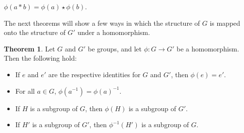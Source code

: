 \documentclass[12pt]{article}
\newcommand{\inv}[1]{#1^{-1}}
\theoremstyle{definition}
\newtheorem{theorem}{Theorem}[section]
\theoremstyle{definition}
\theoremstyle{definition}
\theoremstyle{definition}
\begin{document}
\begin{center}
    $\phi(a*b) = \phi(a) \star \phi(b)$.
\end{center}

The next theorems will show a few ways in which the structure of $G$ is mapped onto the structure of $G'$ under a homomorphism.

\begin{theorem}
Let $G$ and $G'$ be groups, and let $\phi: G \to G'$ be a homomorphism. Then the following hold:
\begin{itemize}
    \item If $e$ and $e'$ are the respective identities for $G$ and $G'$, then $\phi(e) = e'$.
    \item For all $a \in G$, $\phi(\inv{a}) = \inv{\phi(a)}$.
    \item If $H$ is a subgroup of $G$, then $\phi(H)$ is a subgroup of $G'$.
    \item If $H'$ is a subgroup of $G'$, then $\inv{\phi}(H')$ is a subgroup of $G$.
\end{itemize}
\end{theorem}
\end{document}
